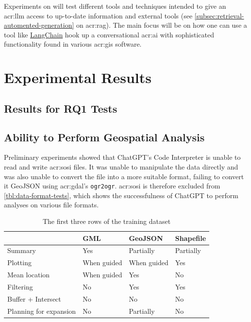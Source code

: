 Experiments on  will test different tools and techniques intended to give an \acrshort{acr:llm} access to up-to-date information and external tools (see \autoref{subsec:retrieval-automented-generation} on \acrlong{acr:rag}). The main focus will be on how one can use a tool like \hyperref[subsubsec:langchain]{LangChain} hook up a conversational \acrshort{acr:ai} with sophisticated functionality found in various \acrshort{acr:gis} software.

\section{Experimental Results}
\label{sec:experimentalResults}

\subsection[Results for RQ1 Tests]{Results for RQ1 Tests }

\subsection{Ability to Perform Geospatial Analysis}

Preliminary experiments showed that ChatGPT's Code Interpreter is unable to read and write \acrshort{acr:sosi} files. It was unable to manipulate the data directly and was also unable to convert the file into a more suitable format, failing to convert it GeoJSON using \acrshort{acr:gdal}'s \texttt{ogr2ogr}. \acrshort{acr:sosi} is therefore excluded from \autoref{tbl:data-format-tests}, which shows the successfulness of ChatGPT to perform analyses on various file formats.

\begin{table}
    \centering
    \begin{tabular}{l|p{}p{}p{}}
        \toprule
                               & \textbf{GML} & \textbf{GeoJSON} & \textbf{Shapefile} \\
        \midrule
        Summary                & Yes          & Partially        & Partially          \\
        Plotting               & When guided  & When guided      & Yes                \\
        Mean location          & When guided  & Yes              & No                 \\
        Filtering              & No           & Yes              & Yes                \\
        Buffer + Intersect     & No           & No               & No                 \\
        Planning for expansion & No           & Partially        & No                 \\
        \bottomrule
    \end{tabular}
    \caption{The first three rows of the training dataset}
    \label{tbl:data-format-tests}
\end{table}

